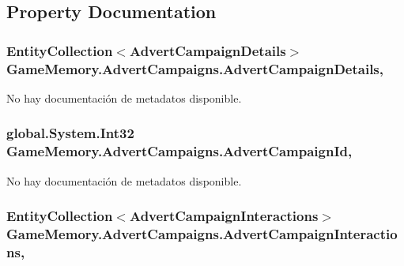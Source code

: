 \subsection{Property Documentation}
\hypertarget{class_game_memory_1_1_advert_campaigns_a6e7c57f8db8798bdbdddcaafa8e8cbae}{
\subsubsection[{Advert\-Campaign\-Details}]{\setlength{\rightskip}{0pt plus 5cm}Entity\-Collection$<${\bf Advert\-Campaign\-Details}$>$ Game\-Memory.\-Advert\-Campaigns.\-Advert\-Campaign\-Details\hspace{0.3cm}{\ttfamily [get]}, {\ttfamily [set]}}}\label{class_game_memory_1_1_advert_campaigns_a6e7c57f8db8798bdbdddcaafa8e8cbae}


No hay documentación de metadatos disponible. 

\hypertarget{class_game_memory_1_1_advert_campaigns_ac2975a0fe8a976df5913d28aad480de8}{
\subsubsection[{Advert\-Campaign\-Id}]{\setlength{\rightskip}{0pt plus 5cm}global.\-System.\-Int32 Game\-Memory.\-Advert\-Campaigns.\-Advert\-Campaign\-Id\hspace{0.3cm}{\ttfamily [get]}, {\ttfamily [set]}}}\label{class_game_memory_1_1_advert_campaigns_ac2975a0fe8a976df5913d28aad480de8}


No hay documentación de metadatos disponible. 

\hypertarget{class_game_memory_1_1_advert_campaigns_af100fbf823e76ee9df9436ac59717435}{
\subsubsection[{Advert\-Campaign\-Interactions}]{\setlength{\rightskip}{0pt plus 5cm}Entity\-Collection$<${\bf Advert\-Campaign\-Interactions}$>$ Game\-Memory.\-Advert\-Campaigns.\-Advert\-Campaign\-Interactions\hspace{0.3cm}{\ttfamily [get]}, {\ttfamily [set]}}}\label{class_game_memory_1_1_advert_campaigns_af100fbf823e76ee9df9436ac59717435}


